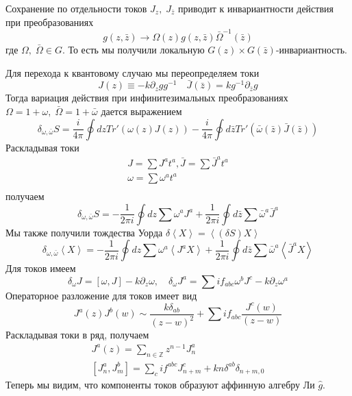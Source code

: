 \documentclass[a4paper,12pt]{article}
\theoremstyle{definition} \newtheorem{Def}{Definition}
\begin{document}
Сохранение по отдельности токов $J_z,\; J_{\bar z}$ приводит к инвариантности действия при преобразованиях
\begin{equation}
  \label{eq:81}
   g(z,\bar z)\to \Omega(z)g(z,\bar z)\bar \Omega^{-1}(\bar z)
\end{equation}
где $\Omega,\;\bar \Omega \in G$. То есть мы получили локальную $G(z)\times G(\bar z)$-инвариантность. 

Для перехода к квантовому случаю мы переопределяем токи
\begin{equation}
  \label{eq:82}
  J(z)\equiv -k \partial_zg g^{-1}\quad \bar J(\bar z)=k g^{-1}\partial_{\bar z}g
\end{equation}
Тогда вариация действия при инфинитезимальных преобразованиях $\Omega=1+\omega,\; \bar \Omega =1+\bar \omega$ дается выражением
\begin{equation}
  \label{eq:83}
  \delta_{\omega,\bar\omega}S=\frac{i}{4\pi}\oint dz Tr' (\omega(z)J(z))-\frac{i}{4\pi}\oint d\bar z Tr'(\bar\omega(\bar z)\bar J(\bar z))
\end{equation}
Раскладывая токи
\begin{equation}
  \label{eq:85}
  \begin{aligned}
    J=\sum J^a t^a,\bar J=\sum \bar J^a t^a \\
    \omega=\sum \omega^a t^a\\
  \end{aligned}
\end{equation}
получаем
\begin{equation}
  \label{eq:86}
  \delta_{\omega,\bar \omega}S=-\frac{1}{2\pi i}\oint dz \sum\omega^a J^a+\frac{1}{2\pi i} \oint d\bar z \sum \bar \omega^a \bar J^a
\end{equation}
Мы также получили тождества Уорда $\delta\left< X\right>=\left<(\delta S)X\right>$
\begin{equation}
  \label{eq:87}
  \delta_{\omega,\bar \omega}\left< X \right>=-\frac{1}{2\pi i}\oint dz \sum\omega^a \left< J^a X\right>+
  \frac{1}{2\pi i} \oint d\bar z \sum \bar \omega^a \left< \bar J^a X\right>
\end{equation}
Для токов имеем
\begin{equation}
  \label{eq:88}
  \delta_{\omega}J=[\omega,J]-k\partial_z\omega,\quad \delta_{\omega}J^a=\sum i f_{abc}\omega^b J^c-k\partial_z\omega^a
\end{equation}
Операторное разложение для токов имеет вид 
\begin{equation}
  \label{eq:89}
  J^a(z) J^b(w) \sim \frac{k\delta_{ab}}{(z-w)^2}+\sum i f_{abc}\frac{J^c(w)}{(z-w)}
\end{equation}
Раскладывая токи в ряд, получаем
\begin{equation}
  \label{eq:90}
  \begin{aligned}
    J^a(z)=\sum_{n\in \mathbb Z}z^{n-1}J^a_n\\    
    \left[J^a_n,J^b_m\right]=\sum_c i f^{abc}J^c_{n+m}+kn\delta^{ab}\delta_{n+m,0}  
  \end{aligned}
\end{equation}
Теперь мы видим, что компоненты токов образуют аффинную алгебру Ли $\hat g$.  
\end{document}
